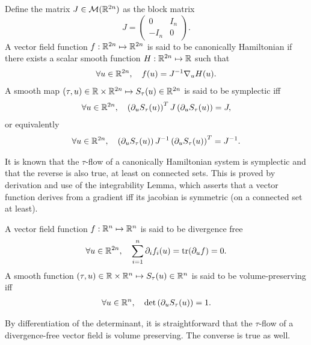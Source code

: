 \begin{definition}
  Define the matrix $J \in {\cal M}(\mathbb{R}^{2n})$ as the block matrix
  $$
  J = \left(
  \begin{array}{cc}
    0 & I_n \\
    -I_n & 0
  \end{array}
  \right).
  $$
  A vector field function $f:\mathbb{R}^{2n} \mapsto \mathbb{R}^{2n}$ is said to be
  canonically  Hamiltonian if there exists a scalar smooth function
  $H:\mathbb{R}^{2n} \mapsto \mathbb{R}$ such that 
  \begin{align*}
    \forall u \in \mathbb{R}^{2n}, \quad f(u) = J^{-1} \nabla_u H(u).
  \end{align*}
  A smooth map $(\tau,u) \in \mathbb{R} \times \mathbb{R}^{2n} \mapsto  S_\tau(u) \in
  \mathbb{R}^{2n}$ is said to be symplectic iff
  \begin{align} \label{def:symplectif} %
    \forall u \in \R^{2n}, \quad 
    \left(\partial_u S_\tau(u)\right)^T J \left(\partial_u S_\tau(u)\right) = J,
  \end{align}
  or equivalently
  \begin{align} %
    \forall u \in \R^{2n}, \quad 
    \left(\partial_u S_\tau(u)\right) J^{-1} \left(\partial_u S_\tau(u)\right)^T = J^{-1} .
  \end{align}
\end{definition}
\begin{remark}
  It is known that the $\tau$-flow of a canonically Hamiltonian system is
  symplectic and that the reverse is also true, at least on connected
  sets. This is proved by derivation and use of the integrability Lemma,
  which asserts that a vector function derives from a gradient iff its
  jacobian is symmetric (on a connected set at least).
\end{remark}
\begin{definition}
  A vector field function $f:\mathbb{R}^{n} \mapsto \mathbb{R}^{n}$ is said to be
  divergence free 
  \begin{align*}
    \forall u \in \mathbb{R}^{2n}, \quad \sum_{i=1}^n \partial_i f_i(u) = \operatorname{tr}(\partial_u f)=0.
  \end{align*}
  A smooth function $(\tau,u) \in \mathbb{R} \times \mathbb{R}^{n} \mapsto  S_\tau(u) \in
  \mathbb{R}^{n}$ is said to be volume-preserving iff
  \begin{align*}
    \forall u \in \mathbb{R}^n, \quad \det\left (\partial_u S_\tau(u)\right)=1.
  \end{align*}
\end{definition}
\begin{remark}
  By differentiation of the determinant, it is straightforward that the
  $\tau$-flow of a divergence-free vector field is volume preserving. The
  converse is true as well. 
\end{remark}

